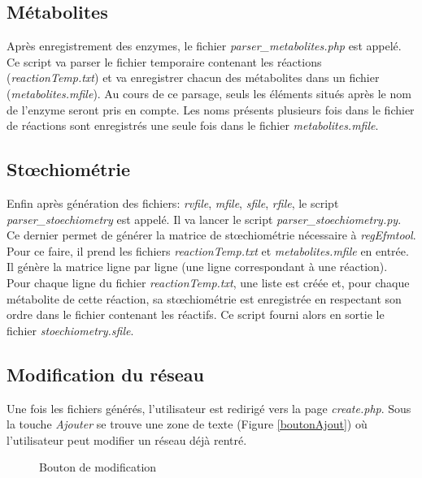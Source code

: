 \subsection{Métabolites}
Après enregistrement des enzymes, le fichier \emph{parser\_metabolites.php} est appelé. Ce script va parser le fichier temporaire contenant les réactions (\emph{reactionTemp.txt}) et va enregistrer chacun des métabolites dans un fichier (\emph{metabolites.mfile}). Au cours de ce parsage, seuls les éléments situés après le nom de l'enzyme seront pris en compte. Les noms présents plusieurs fois dans le fichier de réactions sont enregistrés une seule fois dans le fichier \emph{metabolites.mfile}.

\subsection{Stœchiométrie}
Enfin après génération des fichiers: \emph{rvfile}, \emph{mfile}, \emph{sfile}, \emph{rfile}, le script \emph{parser\_stoechiometry} est appelé. Il va lancer le script \emph{parser\_stoechiometry.py}. Ce dernier permet de générer la matrice de stœchiométrie nécessaire à \emph{regEfmtool}. Pour ce faire, il prend les fichiers \emph{reactionTemp.txt} et \emph{metabolites.mfile} en entrée. Il génère la matrice ligne par ligne (une ligne correspondant à une réaction). \\
Pour chaque ligne du fichier \emph{reactionTemp.txt}, une liste est créée et, pour chaque métabolite de cette réaction, sa stœchiométrie est enregistrée en respectant son ordre dans le fichier contenant les réactifs. Ce script fourni alors en sortie le fichier \emph{stoechiometry.sfile}.

\subsection{Modification du réseau}
Une fois les fichiers générés, l'utilisateur est redirigé vers la page \emph{create.php}.
Sous la touche \emph{Ajouter} se trouve une zone de texte (Figure \ref{boutonAjout}) où l'utilisateur peut modifier un réseau déjà rentré.

\begin{figure}[!ht]
    \begin{center}
        \caption{Bouton de modification}
          \label{boutonModif}
      \end{center}   
\end{figure}

